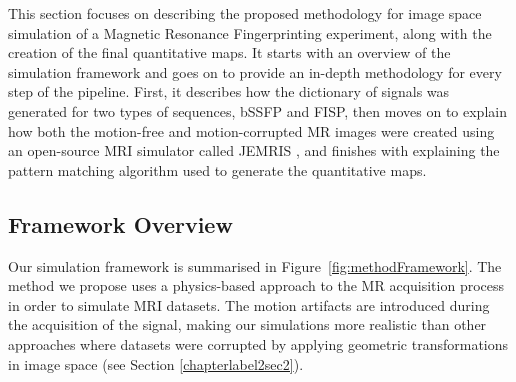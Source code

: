 
This section focuses on describing the proposed methodology for image space simulation of a Magnetic Resonance Fingerprinting experiment, along with the creation of the final quantitative maps.
It starts with an overview of the simulation framework and goes on to provide an in-depth methodology for every step of the pipeline.
First, it describes how the dictionary of signals was generated for two types of sequences, bSSFP and FISP, 
then moves on to explain how both the motion-free and motion-corrupted MR images were created using an open-source MRI simulator called JEMRIS \cite{Stocker2010},
and finishes with explaining the pattern matching algorithm used to generate the quantitative maps.

\subsection{Framework Overview}
\label{method:overview}

Our simulation framework is summarised in Figure~\ref{fig:methodFramework}.
The method we propose uses a physics-based approach to the MR acquisition process in order to simulate MRI datasets.
The motion artifacts are introduced during the acquisition of the signal, making our simulations more realistic than other approaches where datasets were corrupted by applying geometric transformations in image space (see Section \ref{chapterlabel2sec2}).

